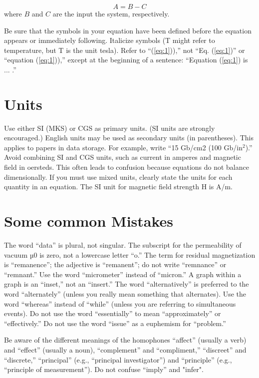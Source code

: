 \documentclass[conference]{IEEEtran}
\begin{document}
\begin{equation}
    \label{eq:1}
    A=B-C
\end{equation}
%
where $B$ and $C$ are the input the system, respectively. 

Be sure that the symbols in your equation have been defined before the equation appears or immediately following. Italicize symbols (T might refer to temperature, but T is the unit tesla). Refer to “(\ref{eq:1})),” not “Eq. (\ref{eq:1})” or “equation (\ref{eq:1})),” except at the beginning of a sentence: “Equation (\ref{eq:1}) is ... .” 


\section{Units}

Use either SI (MKS) or CGS as primary units. (SI units are strongly encouraged.) English units may be used as secondary units (in parentheses). This applies to papers in data storage. For example, write “15 Gb/cm2 (100 Gb/in$^2$).” Avoid combining SI and CGS units, such as current in amperes and magnetic field in oersteds. This often leads to confusion because equations do not balance dimensionally. If you must use mixed units, clearly state the units for each quantity in an equation. The SI unit for magnetic field strength H is A/m. 

\section{Some common Mistakes}

The word “data” is plural, not singular. The subscript for the permeability of vacuum µ0 is zero, not a lowercase letter “o.” The term for residual magnetization is “remanence”; the adjective is “remanent”; do not write “remnance” or “remnant.” Use the word “micrometer” instead of “micron.” A graph within a graph is an “inset,” not an “insert.” The word “alternatively” is preferred to the word “alternately” (unless you really mean something that alternates). Use the word “whereas” instead of “while” (unless you are referring to simultaneous events). Do not use the word “essentially” to mean “approximately” or “effectively.” Do not use the word “issue” as a euphemism for “problem.” 

Be aware of the different meanings of the homophones “affect” (usually a verb) and “effect” (usually a noun), “complement” and “compliment,” “discreet” and “discrete,” “principal” (e.g., “principal investigator”) and “principle” (e.g., “principle of measurement”). Do not confuse “imply” and "infer". 
\end{document}
